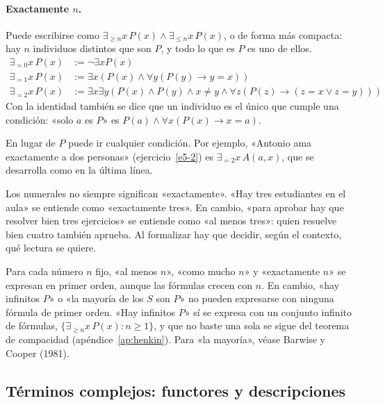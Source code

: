 \paragraph{Exactamente $n$.} Puede escribirse como $\exists_{\geq n} x\, P(x) \land \exists_{\leq n} x\, P(x)$, o de forma más compacta: hay $n$ individuos distintos que son $P$, y todo lo que es $P$ es uno de ellos.
\begin{align*}
\exists_{= 0} x\, P(x) &:= \neg \exists x P(x)\\
\exists_{= 1} x\, P(x) &:= \exists x (P(x) \land \forall y (P(y) \to y = x))\\
\exists_{= 2} x\, P(x) &:= \exists x \exists y (P(x) \land P(y) \land x \neq y \land \forall z (P(z) \to (z = x \lor z = y)))
\end{align*}
Con la identidad también se dice que un individuo es el único que cumple una condición: «solo $a$ es $P$» es $P(a) \land \forall x (P(x) \to x = a)$.

En lugar de $P$ puede ir cualquier condición. Por ejemplo, «Antonio ama exactamente a dos personas» (ejercicio~\ref{e5-2}) es $\exists_{= 2} x\, A(a, x)$, que se desarrolla como en la última línea.

\begin{observacion}
Los numerales no siempre significan «exactamente». «Hay tres
estudiantes en el aula» se entiende como «exactamente tres». En
cambio, «para aprobar hay que resolver bien tres ejercicios» se
entiende como «al menos tres»: quien resuelve bien cuatro también
aprueba. Al formalizar hay que decidir, según el contexto, qué lectura
se quiere.
\end{observacion}

\begin{observacion}[Límites]
Para cada número $n$ fijo, «al menos $n$», «como mucho $n$» y «exactamente $n$» se expresan en primer orden, aunque las fórmulas crecen con $n$. En cambio, «hay infinitos $P$» o «la mayoría de los $S$ son $P$» no pueden expresarse con ninguna fórmula de primer orden. «Hay infinitos $P$» sí se expresa con un conjunto infinito de fórmulas, $\{\exists_{\geq n} x\, P(x) : n \geq 1\}$, y que no baste una sola se sigue del teorema de compacidad (apéndice~\ref{ap:henkin}). Para «la mayoría», véase Barwise y Cooper (1981).
\end{observacion}

\subsection{Términos complejos: functores y descripciones\ampliacion}

